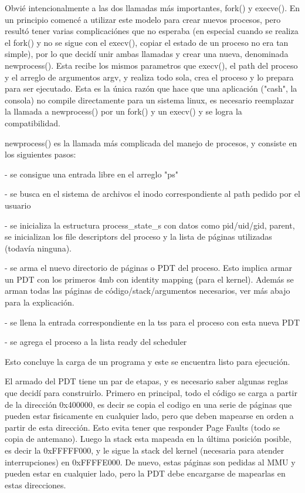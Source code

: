 Obvié intencionalmente a las dos llamadas más importantes, fork() y execve().
En un principio comencé a utilizar este modelo para crear nuevos procesos, pero
resultó tener varias complicaciónes que no esperaba (en especial cuando se
realiza el fork() y no se sigue con el execv(), copiar el estado de un proceso
no era tan simple), por lo que decidí unir ambas llamadas y crear una nueva,
denominada newprocess(). Esta recibe los mismos parametros que execv(), el path
del proceso y el arreglo de argumentos argv, y realiza todo sola, crea el
proceso y lo prepara para ser ejecutado. Esta es la única razón que hace que
una aplicación ("cash", la consola) no compile directamente para un sistema
linux, es necesario reemplazar la llamada a newprocess() por un fork() y un
execv() y se logra la compatibilidad.

newprocess() es la llamada más complicada del manejo de procesos, y consiste en
los siguientes pasos:

- se consigue una entrada libre en el arreglo "ps"

- se busca en el sistema de archivos el inodo correspondiente al path pedido
por el usuario

- se inicializa la estructura process\_state\_s con datos como pid/uid/gid,
parent, se inicializan los file descriptors del proceso y la lista de páginas
utilizadas (todavía ninguna).

- se arma el nuevo directorio de páginas o PDT del proceso. Esto implica armar
un PDT con los primeros 4mb con identity mapping (para el kernel). Además se
arman todas las páginas de código/stack/argumentos necesarios, ver más abajo
para la explicación.

- se llena la entrada correspondiente en la tss para el proceso con esta nueva
PDT

- se agrega el proceso a la lista ready del scheduler

Esto concluye la carga de un programa y este se encuentra listo para ejecución.

El armado del PDT tiene un par de etapas, y es necesario saber algunas reglas
que decidí para construirlo. Primero en principal, todo el código se carga a
partir de la dirección 0x400000, es decir se copia el codigo en una serie de
páginas que pueden estar fisicamente en cualquier lado, pero que deben mapearse
en orden a partir de esta dirección. Esto evita tener que responder Page Faults
(todo se copia de antemano). Luego la stack esta mapeada en la última posición
posible, es decir la 0xFFFFF000, y le sigue la stack del kernel (necesaria para
atender interrupciones) en 0xFFFFE000. De nuevo, estas páginas son pedidas al
MMU y pueden estar en cualquier lado, pero la PDT debe encargarse de mapearlas
en estas direcciones.


